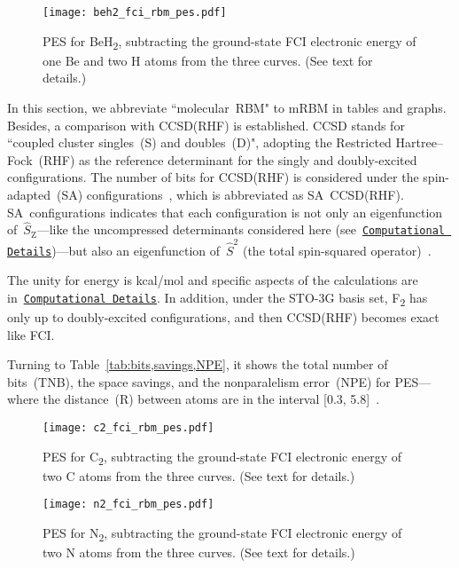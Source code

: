 \documentclass[%
 amsmath,amssymb,
 aps,prl, %
 reprint,%
]{revtex4-1}
\begin{document}
\begin{figure}[t!]
    \hypertarget{fig:BeH2_PES}{}
    \centering
    \texttt{[image: beh2\_fci\_rbm\_pes.pdf]} 
    \caption{PES for BeH\textsubscript{2}, subtracting the ground-state FCI electronic energy of one Be and two H atoms from the three curves. (See text for details.)}
\end{figure}

\indent In this section, we abbreviate ``molecular~RBM" to mRBM in tables and graphs. Besides, a comparison with CCSD(RHF) is established. CCSD stands for ``coupled cluster singles~(S) and doubles~(D)", adopting the Restricted Hartree--Fock~(RHF) as the reference determinant for the singly and doubly-excited configurations. The number of bits for CCSD(RHF) is considered under the spin-adapted~(SA) configurations~\cite{Szabo1989,Pauncz1979,Helgaker2000}, which is abbreviated as SA~CCSD(RHF). SA~configurations indicates that each configuration is not only an eigenfunction of~$\hat{S}_{\text{Z}}$---like the uncompressed determinants considered here (see~\hyperlink{sec:comp_det}{\texttt{Computational Details}})---but also an eigenfunction of~$\hat{S}^{2}$ (the total spin-squared operator)~\cite{Szabo1989,Pauncz1979,Helgaker2000,Roos1994,Shankar1994}. 

\indent The unity for energy is kcal/mol and specific aspects of the calculations are in~\hyperlink{sec:comp_det}{\texttt{Computational Details}}. In addition, under the STO-3G basis set, F\textsubscript{2} has only up to doubly-excited configurations, and then CCSD(RHF) becomes exact like FCI. 

\indent Turning to Table~\ref{tab:bits,savings,NPE}, it shows the total number of bits~(TNB), the space savings, and the nonparalelism error~(NPE) for PES---where the distance~(R) between atoms are in the interval [0.3, 5.8]~.


\begin{figure}[b!]
    \hypertarget{fig:C2_PES}{}
    \centering
    \texttt{[image: c2\_fci\_rbm\_pes.pdf]}
    \caption{PES for C\textsubscript{2}, subtracting the ground-state FCI electronic energy of two C atoms from the three curves. (See text for details.)}
\end{figure}


\begin{figure}[t]
    \hypertarget{fig:N2_PES}{}
    \centering
    \texttt{[image: n2\_fci\_rbm\_pes.pdf]}
    \caption{PES for N\textsubscript{2}, subtracting the ground-state FCI electronic energy of two N atoms from the three curves. (See text for details.)}
\end{figure}
\end{document}
